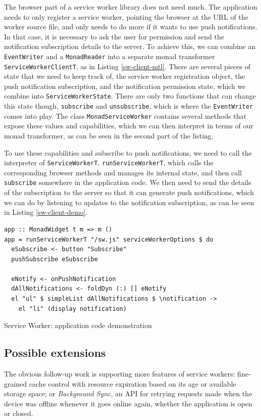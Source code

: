 \documentclass[english,zadani,odsaz]{fitthesis}
\begin{document}
The browser part of a service worker library does not need much. The application
needs to only register a service worker, pointing the browser at the URL of the
worker source file, and only needs to do more if it wants to use push
notifications. In that case, it is necessary to ask the user for permission and
send the notification subscription details to the server. To achieve this, we
can combine an \texttt{EventWriter} and a \texttt{MonadReader} into a separate monad transformer
\texttt{ServiceWorkerClientT}, as in Listing \ref{sw-client-mtl}. There are several pieces
of state that we need to keep track of, the service worker registration object,
the push notification subscription, and the notification permission state, which
we combine into \texttt{ServiceWorkerState}. There are only two functions that can change
this state though, \texttt{subscribe} and \texttt{unsubscribe}, which is where the \texttt{EventWriter}
comes into play. The class \texttt{MonadServiceWorker} contains several methods that
expose these values and capabilities, which we can then interpret in terms of our
monad transformer, as can be seen in the second part of the listing.

To use these capabilities and subscribe to push notifications, we need to call
the interpreter of \texttt{ServiceWorkerT}, \texttt{runServiceWorkerT}, which calls the
corresponding browser methods and manages its internal state, and then call
\texttt{subscribe} somewhere in the application code. We then need to send the details of
the subscription to the server so that it can generate push notifications, which
we can do by listening to updates to the notification subscription, as can be
seen in Listing \ref{sw-client-demo}.

\begin{listing}[t]
\begin{verbatim}
app :: MonadWidget t m => m ()
app = runServiceWorkerT "/sw.js" serviceWorkerOptions $ do
  eSubscribe <- button "Subscribe"
  pushSubscribe eSubscribe

  eNotify <- onPushNotification
  dAllNotifications <- foldDyn (:) [] eNotify
  el "ul" $ simpleList dAllNotifications $ \notification ->
    el "li" (display notification)
\end{verbatim}
\caption{Service Worker: application code demonstration \label{sw-client-demo}}
\end{listing}

\subsection{Possible extensions}
\label{sec:org75cc45e}
The obvious follow-up work is supporting more features of service workers:
fine-grained cache control with resource expiration based on its age or
available storage space; or \emph{Background Sync}, an API for retrying requests made
when the device was offline whenever it goes online again, whether the
application is open or closed.
\end{document}
